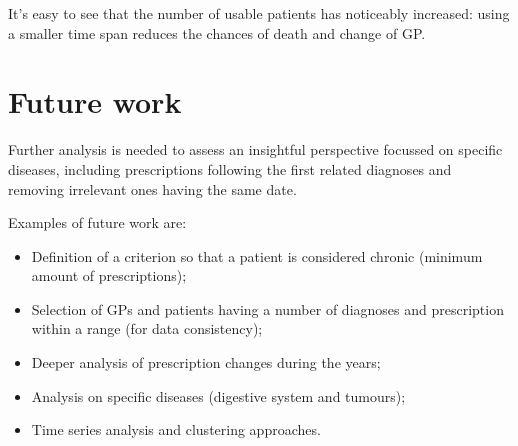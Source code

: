 It's easy to see that the number of usable patients has noticeably increased: using a smaller time span reduces the chances of death and change of GP.

\section{Future work}
Further analysis is needed to assess an insightful perspective focussed on specific diseases, including prescriptions following the first related diagnoses and removing irrelevant ones having the same date.

Examples of future work are:
\begin{itemize}
	\item Definition of a criterion so that a patient is considered chronic (minimum amount of prescriptions);
	\item Selection of GPs and patients having a number of diagnoses and prescription within a range (for data consistency);
	\item Deeper analysis of prescription changes during the years;
	\item Analysis on specific diseases (digestive system and tumours);
	\item Time series analysis and clustering approaches.
\end{itemize}